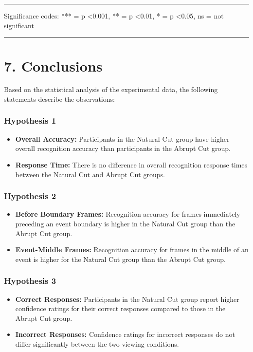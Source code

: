 \documentclass[10pt,a4paper]{article}
\begin{document}
\rule{\linewidth}{0.4pt}
Significance codes: *** = p \textless 0.001,  ** = p \textless 0.01,  * = p \textless 0.05,  ns = not significant
\rule{\linewidth}{0.4pt}

\section{7. Conclusions}
Based on the statistical analysis of the experimental data, the following statements describe the observations:

\subsubsection{Hypothesis 1}
\begin{itemize}
    \item \textbf{Overall Accuracy:} Participants in the Natural Cut group have higher overall recognition accuracy than participants in the Abrupt Cut group.
    \item \textbf{Response Time:} There is no difference in overall recognition response times between the Natural Cut and Abrupt Cut groups.
\end{itemize}

\subsubsection{Hypothesis 2}
\begin{itemize}
    \item \textbf{Before Boundary Frames:} Recognition accuracy for frames immediately preceding an event boundary is higher in the Natural Cut group than the Abrupt Cut group.
    \item \textbf{Event-Middle Frames:} Recognition accuracy for frames in the middle of an event is higher for the Natural Cut group than the Abrupt Cut group.
\end{itemize}

\subsubsection{Hypothesis 3}
\begin{itemize}
    \item \textbf{Correct Responses:} Participants in the Natural Cut group report higher confidence ratings for their correct responses compared to those in the Abrupt Cut group.
    \item \textbf{Incorrect Responses:} Confidence ratings for incorrect responses do not differ significantly between the two viewing conditions.
\end{itemize}
\end{document}
